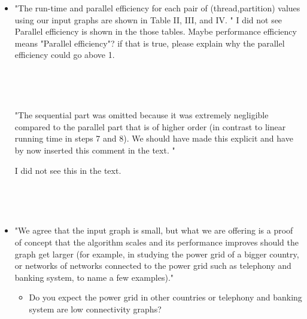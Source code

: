 \begin{itemize}
~

\item "The run-time and parallel efficiency for each pair of (thread,partition) values using our input graphs are shown in Table II, III, and IV. "
I did not see Parallel efficiency is shown in the those tables. Maybe performance efficiency means "Parallel efficiency"? if that is true, please explain why the parallel efficiency could go above 1. 

~


~


"The sequential part was omitted because it was extremely negligible compared to the parallel part that is of higher order (in contrast to linear running time in steps 7 and 8). We should have made this explicit and have by now inserted this comment in the text. "

I did not see this in the text.

~


~


\item "We agree that the input graph is small, but what we are offering is a proof of concept that the algorithm scales and its performance improves should the graph get larger (for example, in studying the power grid of a bigger country, or networks of networks connected to the power grid such as telephony and banking system, to name a few examples)."

\begin{itemize}
\item Do you expect the power grid in other countries or telephony and banking system are low connectivity graphs?  

~


~


\end{itemize}
\end{itemize}

